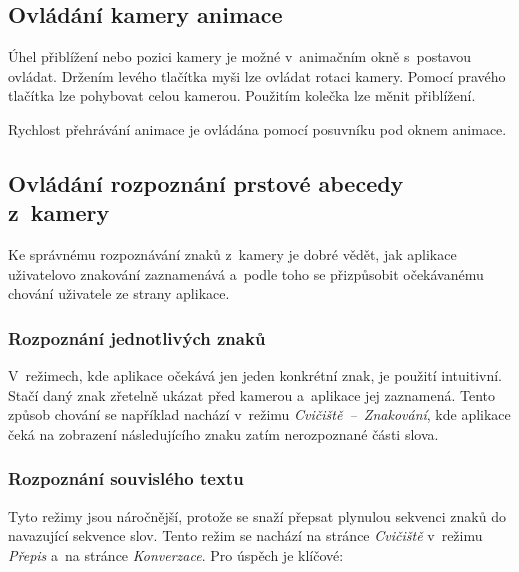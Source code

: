 \documentclass[
  master,
  program=ainfvs,
  biblatex,
  figures=true,
  tables=false,
  sourcecodes=true,
  glossaries,
  index
]{kidiplom}
\begin{document}
    \subsection{Ovládání kamery animace}
        Úhel přiblížení nebo pozici kamery je možné v~animačním okně s~postavou ovládat. Držením levého tlačítka myši lze ovládat rotaci kamery. Pomocí pravého tlačítka lze pohybovat celou kamerou. Použitím kolečka lze měnit přiblížení.

        Rychlost přehrávání animace je ovládána pomocí posuvníku pod oknem animace.

    \subsection{Ovládání rozpoznání prstové abecedy z~kamery}
        Ke správnému rozpoznávání znaků z~kamery je dobré vědět, jak aplikace uživatelovo znakování zaznamenává a~podle toho se přizpůsobit očekávanému chování uživatele ze strany aplikace.

        \subsubsection{Rozpoznání jednotlivých znaků}
            V~režimech, kde aplikace očekává jen jeden konkrétní znak, je použití intuitivní. Stačí daný znak zřetelně ukázat před kamerou a~aplikace jej zaznamená. Tento způsob chování se například nachází v~režimu \emph{Cvičiště~--~Znakování}, kde aplikace čeká na zobrazení následujícího znaku zatím nerozpoznané části slova.

        \subsubsection{Rozpoznání souvislého textu}
            Tyto režimy jsou náročnější, protože se snaží přepsat plynulou sekvenci znaků do navazující sekvence slov. Tento režim se nachází na stránce \emph{Cvičiště} v~režimu \emph{Přepis} a~na stránce \emph{Konverzace}. Pro úspěch je klíčové:
            
\end{document}
